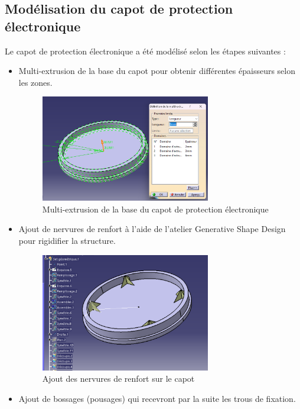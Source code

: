 \documentclass[a4paper,12pt]{report}
\begin{document}
\subsection{Modélisation du capot de protection électronique}
Le capot de protection électronique a été modélisé selon les étapes suivantes :
\begin{itemize}
    \item Multi-extrusion de la base du capot pour obtenir différentes épaisseurs selon les zones.
    \begin{figure}[H]
        \centering
        \includegraphics[width=0.7\textwidth]{images/multi_extrusion_capot.png}
        \caption{Multi-extrusion de la base du capot de protection électronique}
        \label{fig:multi_extrusion_capot}
    \end{figure}
    \item Ajout de nervures de renfort à l'aide de l'atelier Generative Shape Design pour rigidifier la structure.
    \begin{figure}[H]
        \centering
        \includegraphics[width=0.7\textwidth]{images/nervures_capot.png}
        \caption{Ajout des nervures de renfort sur le capot}
        \label{fig:nervures_capot}
    \end{figure}
    \item Ajout de bossages (pousages) qui recevront par la suite les trous de fixation.

\end{itemize}
\end{document}
